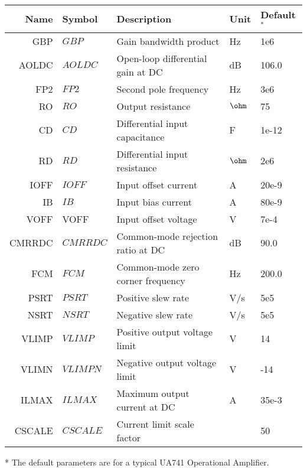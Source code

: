 \begin{longtable}{rllll}
Name & Symbol & Description & Unit & Default$^{*}$\\
\hline
\endhead
GBP & $GBP$ & Gain bandwidth product & Hz & 1e6\\
AOLDC & $AOLDC$ & Open-loop differential gain at DC & dB & 106.0\\
FP2 & $FP2$ & Second pole frequency & Hz & 3e6\\
RO & $RO$ & Output resistance & $\ohm$ & 75\\
CD & $CD$ & Differential input capacitance & F & 1e-12\\
RD & $RD$ & Differential input resistance & $\ohm$ & 2e6\\
IOFF & $IOFF$ & Input offset current & A & 20e-9\\
IB & $IB$ & Input bias current & A & 80e-9\\
VOFF & VOFF & Input offset voltage & V & 7e-4\\
CMRRDC & $CMRRDC$ & Common-mode rejection ratio at DC   & dB & 90.0\\
FCM & $FCM$ & Common-mode zero corner frequency & Hz  & 200.0\\
PSRT & $PSRT$ & Positive slew rate & V/s & 5e5\\
NSRT & $NSRT$ & Negative slew rate & V/s & 5e5\\
VLIMP & $VLIMP$ & Positive output voltage limit & V & 14\\
VLIMN & $VLIMPN$ & Negative output voltage limit & V & -14\\
ILMAX & $ILMAX$ & Maximum output current at DC & A & 35e-3\\
CSCALE & $CSCALE$ & Current limit scale factor &   & 50\\
\end{longtable}

* The default parameters are for a typical UA741 Operational Amplifier.



